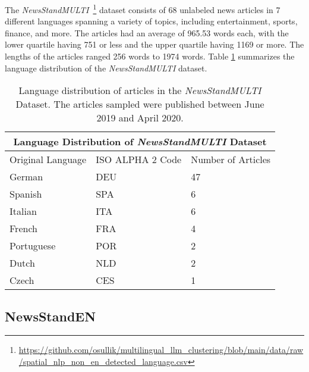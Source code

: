 The \emph{NewsStandMULTI}~\footnote{\url{https://github.com/osullik/multilingual_llm_clustering/blob/main/data/raw/spatial_nlp_non_en_detected_language.csv}} dataset consists of 68 unlabeled news articles in 7 different languages spanning a variety of topics, including entertainment, sports, finance, and more.
The articles had an average of 965.53 words each, with the lower quartile having 751 or less and the upper quartile having 1169 or more.
The lengths of the articles ranged 256 words to 1974 words.
Table \ref{table:newsstandlarge-stats} summarizes the language distribution of the \emph{NewsStandMULTI} dataset.

\begin{table}[ht!]
\centering
\begin{tabular}{ p{2.5cm} p{2cm} p{1.5cm}  }
 \multicolumn{3}{c}{\textbf{Language Distribution of \emph{NewsStandMULTI} Dataset}} \\
 \hline
 Original Language & ISO ALPHA 2 Code & Number of Articles\\
 \hline
 German             & DEU     & 47\\
 Spanish            & SPA     & 6\\
 Italian            & ITA     & 6\\
 French             & FRA     & 4\\
 Portuguese         & POR     & 2\\
 Dutch              & NLD     & 2\\
 Czech              & CES     & 1
\end{tabular}
\caption{Language distribution of articles in the \emph{NewsStandMULTI} Dataset. The articles sampled were published between June 2019 and April 2020.}
\label{table:newsstandlarge-stats}
\end{table}



\subsection{NewsStandEN}

